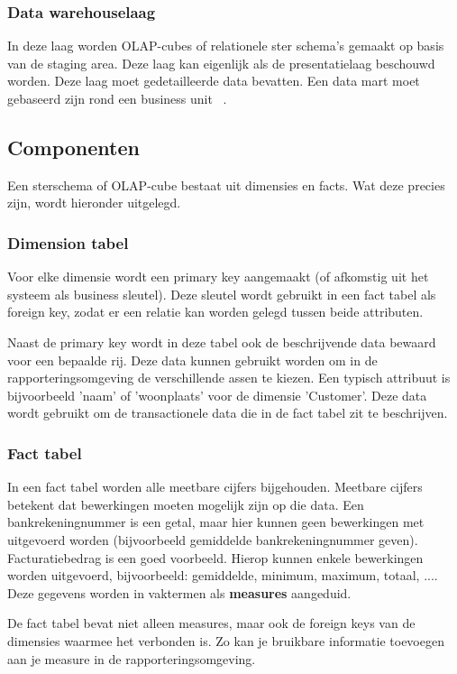 \pagebreak

\subsubsection{Data warehouselaag}
In deze laag worden OLAP-cubes of relationele ster schema's gemaakt op basis van de staging area. Deze laag kan eigenlijk als de presentatielaag beschouwd worden. Deze laag moet gedetailleerde data bevatten. Een data mart moet gebaseerd zijn rond een business unit ~\autocite{Kimball2013}.

\subsection{Componenten}
Een sterschema of OLAP-cube bestaat uit dimensies en facts. Wat deze precies zijn, wordt hieronder uitgelegd. 

\subsubsection{Dimension tabel}
Voor elke dimensie wordt een primary key aangemaakt (of afkomstig uit het systeem als business sleutel). Deze sleutel wordt gebruikt in een fact tabel als foreign key, zodat er een relatie kan worden gelegd tussen beide attributen.

Naast de primary key wordt in deze tabel ook de beschrijvende data bewaard voor een bepaalde rij. Deze data kunnen gebruikt worden om in de rapporteringsomgeving de verschillende assen te kiezen. Een typisch attribuut is bijvoorbeeld 'naam' of 'woonplaats' voor de dimensie 'Customer'. Deze data wordt gebruikt om de transactionele data die in de fact tabel zit te beschrijven.

\subsubsection{Fact tabel}
In een fact tabel worden alle meetbare cijfers bijgehouden. Meetbare cijfers betekent dat bewerkingen moeten mogelijk zijn op die data. Een bankrekeningnummer is een getal, maar hier kunnen geen bewerkingen met uitgevoerd worden (bijvoorbeeld gemiddelde bankrekeningnummer geven). Facturatiebedrag is een goed voorbeeld. Hierop kunnen enkele bewerkingen worden uitgevoerd, bijvoorbeeld: gemiddelde, minimum, maximum, totaal, .... Deze gegevens worden in vaktermen als \textbf{measures} aangeduid. 

De fact tabel bevat niet alleen measures, maar ook de foreign keys van de dimensies waarmee het verbonden is. Zo kan je bruikbare informatie toevoegen aan je measure in de rapporteringsomgeving.

